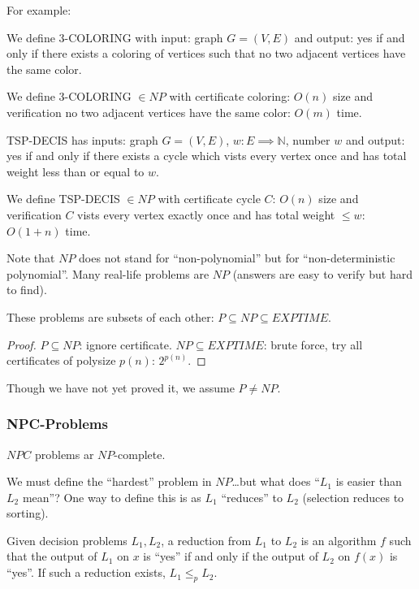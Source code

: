 \documentclass[12pt]{article}
\begin{document}
For example:
\begin{example}
We define 3-COLORING with input: graph $G = (V, E)$ and output: yes if  and only if there exists a coloring of vertices such that no two adjacent vertices have the same color.

We define 3-COLORING $\in NP$ with certificate coloring: $O(n)$ size and verification no two adjacent vertices have the same color: $O(m)$ time.
\end{example}

\begin{example}
TSP-DECIS has inputs: graph $G = (V, E)$, $w: E\implies \mathbb{N}$, number $w$ and output: yes if and only if there exists a cycle which vists every vertex once and has total weight less than or equal to $w$.

We define TSP-DECIS $\in NP$ with certificate cycle $C$: $O(n)$ size and verification $C$ vists every vertex exactly once and has total weight $\leq w$: $O(1 + n)$ time.
\end{example}

Note that $NP$ does not stand for ``non-polynomial'' but for ``non-deterministic polynomial''. Many real-life problems are $NP$ (answers are easy to verify but hard to find).

\begin{theorem}
These problems are subsets of each other: $P \subseteq NP \subseteq EXPTIME$.
\end{theorem}

\begin{proof}
$P \subseteq NP$: ignore certificate. $NP \subseteq EXPTIME$: brute force, try all certificates of polysize $p(n)$: $2^{p(n)}$.
\end{proof}

Though we have not yet proved it, we assume $P \neq NP$.

\subsubsection{NPC-Problems}
$NPC$ problems ar $NP$-complete.

We must define the ``hardest'' problem in $NP$\dots but what does ``$L_1$ is easier than $L_2$ mean''? One way to define this is as $L_1$ ``reduces'' to $L_2$ (selection reduces to sorting).

\begin{definition}
Given decision problems $L_1, L_2$, a reduction from $L_1$ to $L_2$ is an algorithm $f$ such that the output of $L_1$ on $x$ is ``yes'' if and only if the output of $L_2$ on $f(x)$ is ``yes''. If such a reduction exists, $L_1 \leq_p L_2$.
\end{definition}
\end{document}
